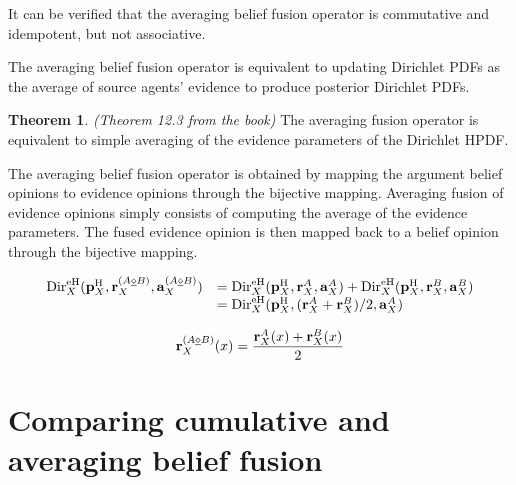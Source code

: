\documentclass[a4paper,12pt]{article}
\theoremstyle{definition}
\theoremstyle{theorem}
\newtheorem{theorem}{Theorem}[section]
\numberwithin{equation}{section}
\begin{document}
It can be verified that the averaging belief fusion operator is commutative and idempotent, but not associative.

The averaging belief fusion operator is equivalent to updating Dirichlet PDFs as the average of source agents’ evidence to produce posterior Dirichlet PDFs.

\begin{theorem}
\emph{(Theorem 12.3 from the book)} The averaging fusion operator is equivalent to
simple averaging of the evidence parameters of the Dirichlet HPDF.
\end{theorem}

The averaging belief fusion operator is obtained by mapping the argument belief opinions to evidence opinions through the bijective mapping. Averaging fusion of evidence opinions simply consists of computing the average of the evidence parameters. The fused evidence opinion is then mapped back to a belief opinion through the bijective mapping.

\begin{equation}
\begin{array}{rl}
\mathrm{Dir}^{\mathrm{eH}}_X(\mathbf{p}^{\mathrm{H}}_X, \mathbf{r}^{(A \underline{\diamond} B)}_X, \mathbf{a}^{(A \underline{\diamond} B)}_X) & = \mathrm{Dir}^{\mathrm{eH}}_X(\mathbf{p}^{\mathrm{H}}_X, \mathbf{r}^{A}_X, \mathbf{a}^{A}_X) + \mathrm{Dir}^{\mathrm{eH}}_X(\mathbf{p}^{\mathrm{H}}_X, \mathbf{r}^{B}_X, \mathbf{a}^{B}_X) \\
& = \mathrm{Dir}^{\mathrm{eH}}_X(\mathbf{p}^{\mathrm{H}}_X, (\mathbf{r}^{A}_X + \mathbf{r}^{B }_X)/2, \mathbf{a}^{A}_X)
\end{array}
\end{equation}

\begin{equation}
\mathbf{r}^{(A \underline{\diamond} B)}_X(x) = \dfrac{\mathbf{r}^A_X(x) + \mathbf{r}^B_X(x)}{2}
\end{equation}


\section{Comparing cumulative and averaging belief fusion}
\end{document}
